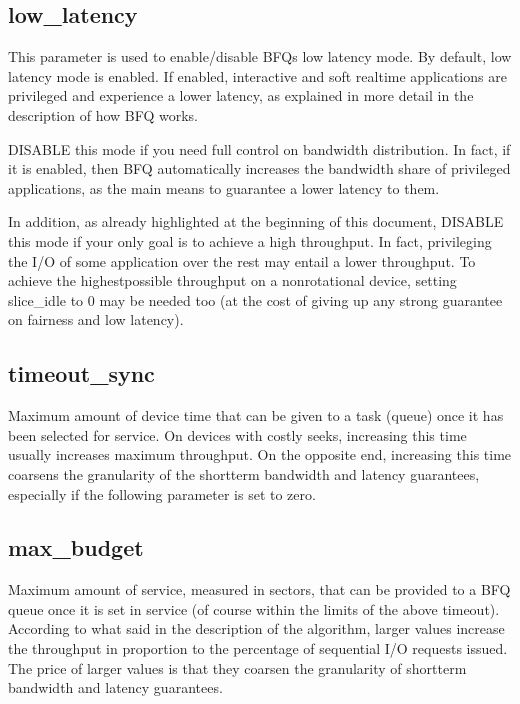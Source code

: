 \documentclass[a4paper,11pt,english]{sphinxmanual}
\begin{document}
\subsection{low\_latency}
\label{\detokenize{bfq-iosched:low-latency}}
This parameter is used to enable/disable BFQ\textquotesingle{}s low latency mode. By
default, low latency mode is enabled. If enabled, interactive and soft
real\sphinxhyphen{}time applications are privileged and experience a lower latency,
as explained in more detail in the description of how BFQ works.

DISABLE this mode if you need full control on bandwidth
distribution. In fact, if it is enabled, then BFQ automatically
increases the bandwidth share of privileged applications, as the main
means to guarantee a lower latency to them.

In addition, as already highlighted at the beginning of this document,
DISABLE this mode if your only goal is to achieve a high throughput.
In fact, privileging the I/O of some application over the rest may
entail a lower throughput. To achieve the highest\sphinxhyphen{}possible throughput
on a non\sphinxhyphen{}rotational device, setting slice\_idle to 0 may be needed too
(at the cost of giving up any strong guarantee on fairness and low
latency).


\subsection{timeout\_sync}
\label{\detokenize{bfq-iosched:timeout-sync}}
Maximum amount of device time that can be given to a task (queue) once
it has been selected for service. On devices with costly seeks,
increasing this time usually increases maximum throughput. On the
opposite end, increasing this time coarsens the granularity of the
short\sphinxhyphen{}term bandwidth and latency guarantees, especially if the
following parameter is set to zero.


\subsection{max\_budget}
\label{\detokenize{bfq-iosched:max-budget}}
Maximum amount of service, measured in sectors, that can be provided
to a BFQ queue once it is set in service (of course within the limits
of the above timeout). According to what said in the description of
the algorithm, larger values increase the throughput in proportion to
the percentage of sequential I/O requests issued. The price of larger
values is that they coarsen the granularity of short\sphinxhyphen{}term bandwidth
and latency guarantees.
\end{document}
